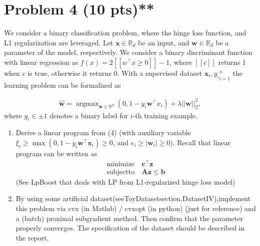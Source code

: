 \documentclass{jsarticle}
\DeclareMathOperator*{\argmax}{argmax}
\begin{document}
\section*{Problem 4 (10 pts)**}
We consider a binary classification problem, where the hinge loss function, and L1 regularization are leveraged. Let $\bm x \in \mathbb R_d$ be an input, and $\bm w \in \mathbb R_d$ be a parameter of the model, respectively. We consider a binary discriminant function with linear regression as $f(x) = 2[\![w^\top x \ge 0]\!] − 1$, where $[\![c]\!]$ returns 1 when $c$ is true, otherwise it returns 0. With a supervised dataset ${\bm x_i , y_i }_{i=1}^n$ the learning problem can be formalized as

\begin{align}
  \hat{\bm w} = \argmax_{\bm w\in \mathbb R^d}(0, 1 − y_i\bm w^\top x_i) + \lambda||\bm w||_2^2,
\end{align}
where $y_i \in {\pm1}$ denotes a binary label for $i$-th training example.
\begin{enumerate}
  \item Derive a linear program from (4) (with auxiliary variable $\xi_i \ge \max(0, 1 − y_i\bm w^\top \bm x_i) \ge 0$, and $e_i \ge |\bm w_i| \ge 0$). Recall that linear program can be written as
  \begin{align*}
  \mathrm{minimize}&\ \bm c^\top \bm z \\
  \mathrm{subject to}&\ \bm A\bm z \le \bm b
  \end{align*}
  (See LpBoost that deals with LP from L1-regularized hinge loss model)
  \item By using some artificial dataset(seeToyDatasetsection,DatasetIV),implement this problem via cvx (in Matlab) / cvxopt (in python) (just for reference) and a (batch) proximal subgradient method. Then confirm that the parameter properly converges. The specification of the dataset should be described in the report.
\end{enumerate}
\end{document}
